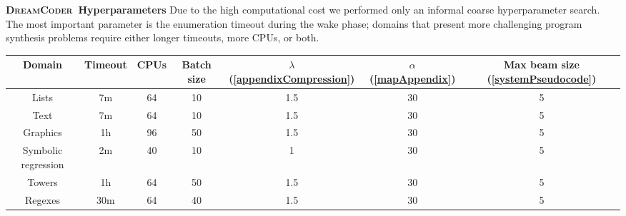 \documentclass{article}
\newcommand{\system}{\textsc{DreamCoder}~}
\begin{document}
\noindent\textbf{\system Hyperparameters}
Due to the high computational cost we
performed only an informal coarse
hyperparameter search.
The most important parameter is
the enumeration timeout during the wake phase;
domains that present more challenging program synthesis
problems require either longer timeouts, more CPUs, or both.
\begin{center}
  \begin{tabular}{ccccccc}
    \toprule
    Domain&Timeout&CPUs&Batch size&$\lambda$ (\ref{appendixCompression})&$\alpha$ (\ref{mapAppendix})&Max beam size (\ref{systemPseudocode})\\\midrule
    Lists&7m&64&10&1.5&30&5\\
    Text&7m&64&10&1.5&30&5\\
    Graphics&1h&96&50&1.5&30&5\\
    Symbolic regression&2m & 40&10 & 1&30&5\\
    Towers& 1h& 64&50 & 1.5&30&5\\
    Regexes&30m & 64&40 & 1.5&30&5\\
    \bottomrule     
  \end{tabular}
\end{center}


%
\end{document}
